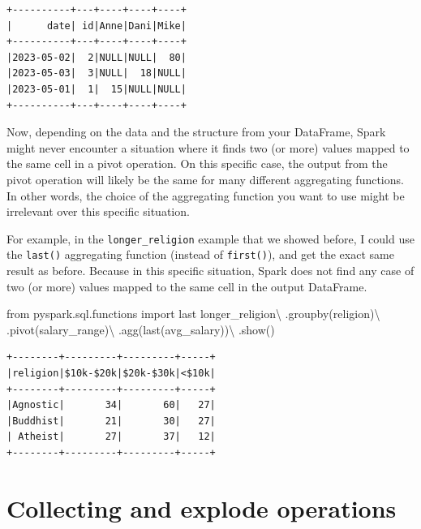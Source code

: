 \documentclass[
  11pt,
  letterpaper,
  DIV=11,
  numbers=noendperiod]{scrreprt}
\newenvironment{Shaded}{\begin{snugshade}}{\end{snugshade}}
\newcommand{\ImportTok}[1]{\textcolor[rgb]{0.00,0.46,0.62}{#1}}
\newcommand{\NormalTok}[1]{\textcolor[rgb]{0.00,0.23,0.31}{#1}}
\newcommand{\OperatorTok}[1]{\textcolor[rgb]{0.37,0.37,0.37}{#1}}
\newcommand{\StringTok}[1]{\textcolor[rgb]{0.13,0.47,0.30}{#1}}
\begin{document}
\begin{verbatim}
+----------+---+----+----+----+
|      date| id|Anne|Dani|Mike|
+----------+---+----+----+----+
|2023-05-02|  2|NULL|NULL|  80|
|2023-05-03|  3|NULL|  18|NULL|
|2023-05-01|  1|  15|NULL|NULL|
+----------+---+----+----+----+
\end{verbatim}

Now, depending on the data and the structure from your DataFrame, Spark
might never encounter a situation where it finds two (or more) values
mapped to the same cell in a pivot operation. On this specific case, the
output from the pivot operation will likely be the same for many
different aggregating functions. In other words, the choice of the
aggregating function you want to use might be irrelevant over this
specific situation.

For example, in the \texttt{longer\_religion} example that we showed
before, I could use the \texttt{last()} aggregating function (instead of
\texttt{first()}), and get the exact same result as before. Because in
this specific situation, Spark does not find any case of two (or more)
values mapped to the same cell in the output DataFrame.

\begin{Shaded}
\begin{Highlighting}[]
\ImportTok{from}\NormalTok{ pyspark.sql.functions }\ImportTok{import}\NormalTok{ last}
\NormalTok{longer\_religion}\OperatorTok{\textbackslash{}}
\NormalTok{    .groupby(}\StringTok{\textquotesingle{}religion\textquotesingle{}}\NormalTok{)}\OperatorTok{\textbackslash{}}
\NormalTok{    .pivot(}\StringTok{\textquotesingle{}salary\_range\textquotesingle{}}\NormalTok{)}\OperatorTok{\textbackslash{}}
\NormalTok{    .agg(last(}\StringTok{\textquotesingle{}avg\_salary\textquotesingle{}}\NormalTok{))}\OperatorTok{\textbackslash{}}
\NormalTok{    .show()}
\end{Highlighting}
\end{Shaded}

\begin{verbatim}
+--------+---------+---------+-----+
|religion|$10k-$20k|$20k-$30k|<$10k|
+--------+---------+---------+-----+
|Agnostic|       34|       60|   27|
|Buddhist|       21|       30|   27|
| Atheist|       27|       37|   12|
+--------+---------+---------+-----+
\end{verbatim}

\section{Collecting and explode
operations}\label{collecting-and-explode-operations}
\end{document}
